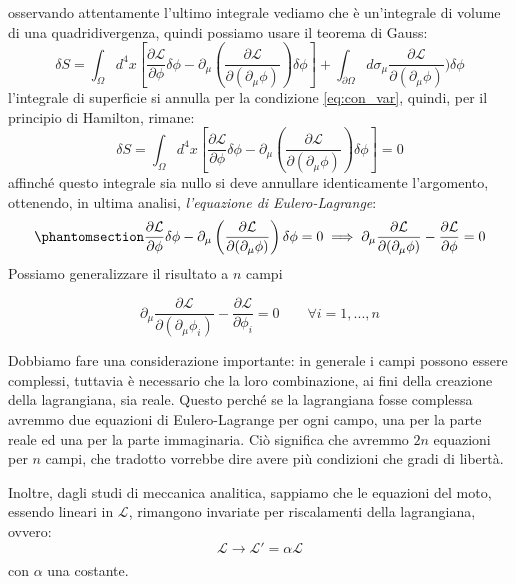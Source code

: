 osservando attentamente l'ultimo integrale vediamo che è un'integrale di volume di una quadridivergenza, quindi possiamo usare il teorema di Gauss:
\begin{equation}
    \delta S=\int_{\Omega }d^4x\left[\dfrac{\partial\mathcal{L}}{\partial \phi}\delta\phi-\partial_\mu\left(\dfrac{\partial \mathcal{L}}{\partial(\partial_\mu\phi)}\right)\delta \phi\right]+\int_{\partial\Omega }d\sigma_\mu\dfrac{\partial \mathcal{L}}{\partial(\partial_\mu\phi)})\delta \phi
\end{equation}
l'integrale di superficie si annulla per la condizione \eqref{eq:con_var}, quindi, per il principio di Hamilton, rimane:
\begin{equation}
    \delta S=\int_{\Omega }d^4x\left[\dfrac{\partial\mathcal{L}}{\partial \phi}\delta\phi-\partial_\mu\left(\dfrac{\partial \mathcal{L}}{\partial(\partial_\mu\phi)}\right)\delta \phi\right]=0
\end{equation}
affinché questo integrale sia nullo si deve annullare identicamente l'argomento, ottenendo, in ultima analisi, \textit{l'equazione di Eulero-Lagrange}:
\begin{equation}\phantomsection\label{eq:ec_eul-la}
    \dfrac{\partial\mathcal{L}}{\partial \phi}\delta\phi-\partial_\mu\left(\dfrac{\partial \mathcal{L}}{\partial(\partial_\mu\phi)}\right)\delta \phi=0 \implies \partial_\mu\dfrac{\partial \mathcal{L}}{\partial(\partial_\mu\phi)}-\dfrac{\partial\mathcal{L}}{\partial \phi}=0
\end{equation}
Possiamo generalizzare il risultato a $n$ campi 

\begin{equation}
    \partial_\mu\dfrac{\partial \mathcal{L}}{\partial(\partial_\mu\phi_i)}-\dfrac{\partial\mathcal{L}}{\partial \phi_i}=0 \qquad \forall i=1,...,n
\end{equation}

Dobbiamo fare una considerazione importante: in generale i campi possono essere complessi, tuttavia è necessario che la loro combinazione, ai fini della creazione della lagrangiana, sia reale. Questo perché se la lagrangiana fosse complessa avremmo due equazioni di Eulero-Lagrange per ogni campo, una per la parte reale ed una per la parte immaginaria. Ciò significa che avremmo $2n$ equazioni per $n$ campi, che tradotto vorrebbe dire avere più condizioni che gradi di libertà.

Inoltre, dagli studi di meccanica analitica, sappiamo che le equazioni del moto, essendo lineari in $\mathcal{L}$, rimangono invariate per riscalamenti della lagrangiana, ovvero:
\begin{equation}
  \mathcal{L}\xrightarrow[\text{}]{\text{}}\mathcal{L}'=\alpha\mathcal{L}
\end{equation}
con $\alpha$ una costante.

